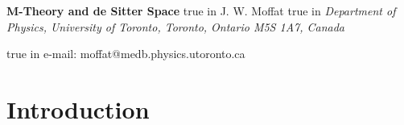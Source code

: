 \documentclass[a4paper,12pt]{article}
\begin{document}
\begin{center}
{\large\bf M-Theory and de Sitter Space}
 true in
{\large J. W. Moffat}
 true in
{\it Department of Physics, University of Toronto,
Toronto, Ontario M5S 1A7, Canada}
\end{center}
\begin{abstract}%
An M-theory constructed in an eleven-dimensional supermanifold with
a $\diamondsuit$-product of field operators is shown to have a de Sitter
space solution. Possible implications of this result for cosmology are
mentioned.
\end{abstract}
 true in e-mail:
moffat@medb.physics.utoronto.ca


\section{Introduction}
\end{document}
